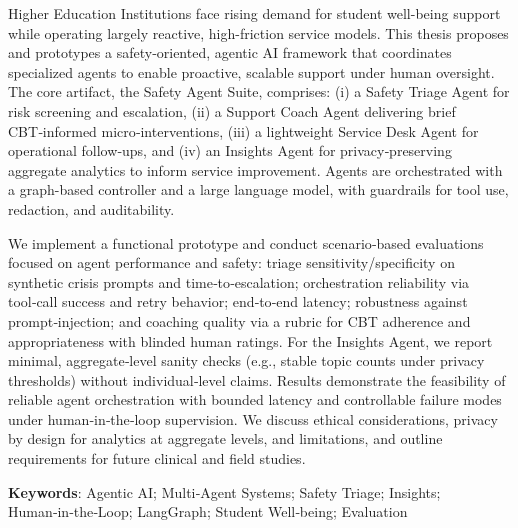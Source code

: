\noindent
Higher Education Institutions face rising demand for student well-being support while operating largely reactive, high-friction service models. This thesis proposes and prototypes a safety‑oriented, agentic AI framework that coordinates specialized agents to enable proactive, scalable support under human oversight. The core artifact, the Safety Agent Suite, comprises: (i) a Safety Triage Agent for risk screening and escalation, (ii) a Support Coach Agent delivering brief CBT‑informed micro‑interventions, (iii) a lightweight Service Desk Agent for operational follow‑ups, and (iv) an Insights Agent for privacy‑preserving aggregate analytics to inform service improvement. Agents are orchestrated with a graph-based controller and a large language model, with guardrails for tool use, redaction, and auditability.

\noindent
We implement a functional prototype and conduct scenario‑based evaluations focused on agent performance and safety: triage sensitivity/specificity on synthetic crisis prompts and time‑to‑escalation; orchestration reliability via tool‑call success and retry behavior; end‑to‑end latency; robustness against prompt‑injection; and coaching quality via a rubric for CBT adherence and appropriateness with blinded human ratings. For the Insights Agent, we report minimal, aggregate‑level sanity checks (e.g., stable topic counts under privacy thresholds) without individual‑level claims. Results demonstrate the feasibility of reliable agent orchestration with bounded latency and controllable failure modes under human‑in‑the‑loop supervision. We discuss ethical considerations, privacy by design for analytics at aggregate levels, and limitations, and outline requirements for future clinical and field studies.

\noindent\textbf{Keywords}: Agentic AI; Multi‑Agent Systems; Safety Triage; Insights; Human‑in‑the‑Loop; LangGraph; Student Well‑being; Evaluation
